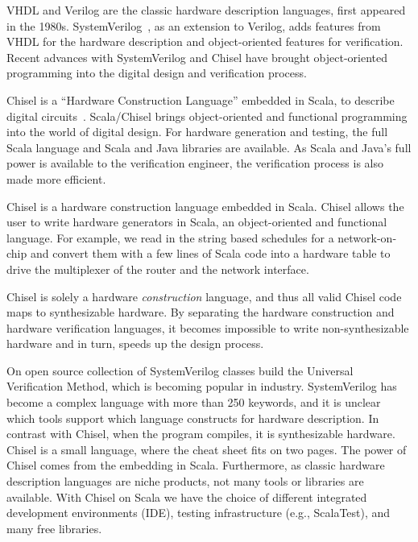 \documentclass[conference]{IEEEtran}
\begin{document}
VHDL and Verilog are the classic hardware description languages, first appeared in the 1980s.
SystemVerilog~\cite{SystemVerilog}, as an extension to Verilog, adds features from VHDL
for the hardware description and object-oriented features for verification.
Recent advances with SystemVerilog and Chisel \cite{chisel:dac2012, chisel:book} have
brought object-oriented programming into the digital design and verification process.

Chisel is a ``Hardware Construction Language'' embedded in Scala, to describe digital circuits~\cite{chisel:dac2012}.
Scala/Chisel brings object-oriented and functional programming into the world of digital design.
For hardware generation and testing, the full Scala language and Scala and Java libraries are available.
As Scala and Java's full power is available to the verification engineer,
the verification process is also made more efficient.


Chisel is a hardware construction language embedded in Scala.
Chisel allows the user to write hardware generators in Scala, an object-oriented and functional language.
For example, we read in the string based schedules for a network-on-chip
and convert them with a few lines of Scala code into a hardware table to
drive the multiplexer of the router and the network interface.

Chisel is solely a hardware \emph{construction} language, and thus all valid Chisel code
maps to synthesizable hardware.
By separating the hardware construction and hardware verification languages,
it becomes impossible to write non-synthesizable hardware and in turn, speeds up the design process.



On open source collection of SystemVerilog classes build the Universal Verification Method,
which is becoming popular in industry.
SystemVerilog has become a complex language with more than 250 keywords, and it is unclear
which tools support which language constructs for hardware description.
In contrast with Chisel, when the program compiles, it is synthesizable hardware.
Chisel is a small language, where the cheat sheet fits on two pages.
The power of Chisel comes from the embedding in Scala.
Furthermore, as classic hardware description languages are niche products, not
many tools or libraries are available. 
With Chisel on Scala we have the choice of different integrated development environments (IDE),
testing infrastructure (e.g., ScalaTest), and many free libraries.
\end{document}
